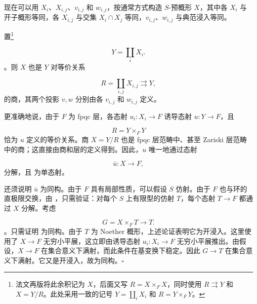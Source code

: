 现在可以用 \(X_i\)、\(X_{i,j}\)、\(v_{i,j}\) 和 \(w_{i,j}\)，按通常方式构造 \(S\)-预概形 \(X\)，其中各 \(X_i\) 与开子概形等同，各 \(X_{i,j}\) 与交集 \(X_i\cap X_j\) 等同，\(v_{i,j}\)、\(w_{i,j}\) 与典范浸入等同。

置\footnote{法文再版将此余积记为 \(X\)，后面又写 \(R=X\times_F X\)，同时使用 \(R\rightrightarrows Y\) 和 \(X=Y/R\)。此处采用一致的记号 \(Y=\coprod_iX_i\) 和 \(R=Y\times_FY\)。}

 \[
  Y=\coprod_i X_i.
\]。则 \(X\) 也是 \(Y\) 对等价关系

 \[
  R=\coprod_{i,j}X_{i,j}
  \rightrightarrows Y,
\] 的商，其两个投影 \(v,w\) 分别由各 \(v_{i,j}\) 和 \(w_{i,j}\) 定义。

更准确地说，由于 \(F\) 为 fpqc 层，各态射 \(u_i:X_i\to F\) 诱导态射 \(u:Y\to F\)，且

 \[
  R=Y\times_FY
\] 恰为 \(u\) 定义的等价关系。商 \(X=Y/R\) 也是 fpqc 层范畴中、甚至 Zariski 层范畴中的商；这直接由商和层的定义得到。因此，\(u\) 唯一地通过态射

 \[
  \overline u:X\longrightarrow F,
\] 分解，且  为单态射。

还须说明 \(\overline u\) 为同构。由于 \(F\) 具有局部性质，可以假设 \(S\) 仿射。由于 \(F\) 也与环的直极限交换，由 ，只需验证：对每个 \(S\) 上有限型的仿射 \(T\)，每个态射 \(T\to F\) 都通过 \(X\) 分解。考虑

 \[
  G=X\times_FT\longrightarrow T.
\]。只需证明  为同构。由于 \(T\) 为 Noether 概形，上述论证表明它为开浸入。这里使用了 \(X\to F\) 无穷小平展，这立即由诱导态射 \(u_i:X_i\to F\) 无穷小平展推出。由假设，\(X\to F\) 在集合意义下满射，而此条件在基变换下稳定。因此 \(G\to T\) 在集合意义下满射。它又是开浸入，故为同构。\hfill\(\square\)


